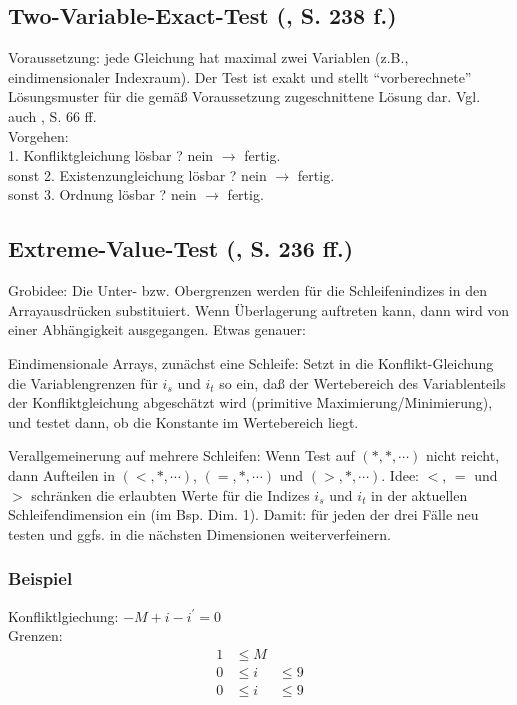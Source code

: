 \subsection{Two-Variable-Exact-Test (\cite{Wol95}, S. 238  f.)}

Voraussetzung: jede Gleichung hat maximal zwei Variablen (z.B.,
eindimensionaler Indexraum). Der Test ist exakt und stellt
``vorberechnete'' Lösungsmuster für die gemäß Voraussetzung
zugeschnittene Lösung dar. Vgl. auch \cite{Ban93}, S. 66 ff.\\
Vorgehen:\\
1. Konfliktgleichung lösbar ? nein \( \rightarrow  \) fertig. \\
sonst 2. Existenzungleichung lösbar ? nein \( \rightarrow \) fertig. \\
sonst 3. Ordnung lösbar ? nein \( \rightarrow \) fertig.


\subsection{Extreme-Value-Test (\cite{Wol95}, S. 236   ff.)}

Grobidee: Die Unter- bzw. Obergrenzen werden für die Schleifenindizes in
den Arrayausdrücken substituiert. Wenn Überlagerung auftreten kann, dann
wird von einer Abhängigkeit ausgegangen. Etwas genauer:

Eindimensionale Arrays, zunächst eine Schleife: Setzt in die
Konflikt-Gleichung die Variablengrenzen für $i_s$ und $i_t$ so ein, daß
der Wertebereich des Variablenteils der Konfliktgleichung abgeschätzt
wird (primitive Maximierung/Minimierung), und testet dann, ob die
Konstante im Wertebereich liegt.

Verallgemeinerung auf mehrere Schleifen: Wenn Test auf $(*,*,\cdots)$
nicht reicht, dann Aufteilen in $(<,*,\cdots)$, $(=,*,\cdots)$ und
$(>,*,\cdots)$. Idee: $<$, $=$ und $>$ schränken die erlaubten Werte für
die Indizes $i_s$ und $i_t$ in der aktuellen Schleifendimension ein (im
Bsp. Dim. 1). Damit: für jeden der drei Fälle neu testen und ggfs. in
die nächsten Dimensionen weiterverfeinern.

\subsubsection{Beispiel}
Konfliktlgiechung: \( -M + i - i^\prime = 0 \) \\
Grenzen:
\begin{align*}
   1 & \leq M \\
   0 & \leq i & \leq 9 \\
   0 & \leq i & \leq 9
\end{align*}

